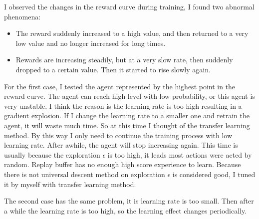 \documentclass{article}
\begin{document}
I observed the changes in the reward curve during training, I found two abnormal phenomena:
\begin{itemize}
    \item The reward suddenly increased to a high value, and then returned to a very low value and no longer increased for long times.
    \item Rewards are increasing steadily, but at a very slow rate, then suddenly dropped to a certain value. Then it started to rise slowly again.
\end{itemize}

For the first case, I tested the agent represented by the highest point in the reward curve. The agent can reach high level with low probability, or this agent is very unstable. I think the reason is the learning rate is too high resulting in a gradient explosion. If I change the learning rate to a smaller one and retrain the agent, it will waste much time. So at this time I thought of the transfer learning method. By this way I only need to continue the training process with low learning rate. After awhile, the agent will stop increasing again. This time is usually because
the exploration $\epsilon$ is too high, it leads most actions were acted by random. Replay buffer
 has no enough high score experience to learn. Because there is not universal descent method on
 exploration $\epsilon$ is considered good, I tuned it by myself with transfer learning method.
 
 The second case has the same problem, it is learning rate is too small. Then after a while the learning rate is too high, so the learning effect changes periodically.
\end{document}
